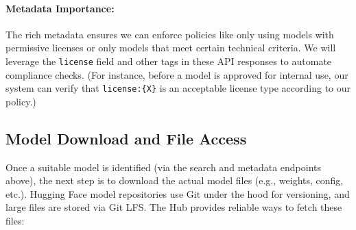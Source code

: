 \documentclass{article}
\begin{document}
\paragraph{Metadata Importance:} The rich metadata ensures we can enforce policies like only using models with permissive licenses or only models that meet certain technical criteria. We will leverage the \texttt{license} field and other tags in these API responses to automate compliance checks. (For instance, before a model is approved for internal use, our system can verify that \texttt{license:\{X\}} is an acceptable license type according to our policy.)

\subsection{Model Download and File Access}
Once a suitable model is identified (via the search and metadata endpoints above), the next step is to download the actual model files (e.g., weights, config, etc.). Hugging Face model repositories use Git under the hood for versioning, and large files are stored via Git LFS. The Hub provides reliable ways to fetch these files:
\end{document}
